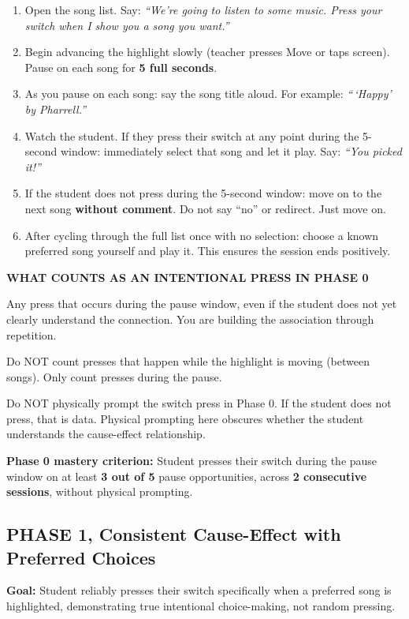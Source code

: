 \documentclass[justified,openright]{tufte-book}
\begin{document}
\begin{enumerate}
\item
  Open the song list. Say: \emph{``We're going to listen to some music.
  Press your switch when I show you a song you want.''}
\item
  Begin advancing the highlight slowly (teacher presses Move or taps
  screen). Pause on each song for \textbf{5 full seconds}.
\item
  As you pause on each song: say the song title aloud. For example:
  \emph{``\,`Happy' by Pharrell.''}
\item
  Watch the student. If they press their switch at any point during the
  5-second window: immediately select that song and let it play. Say:
  \emph{``You picked it!''}
\item
  If the student does not press during the 5-second window: move on to
  the next song \textbf{without comment}. Do not say ``no'' or redirect.
  Just move on.
\item
  After cycling through the full list once with no selection: choose a
  known preferred song yourself and play it. This ensures the session
  ends positively.
\end{enumerate}


\textbf{WHAT COUNTS AS AN INTENTIONAL PRESS IN PHASE 0}

Any press that occurs during the pause window, even if the student
does not yet clearly understand the connection. You are building the
association through repetition.

Do NOT count presses that happen while the highlight is moving (between
songs). Only count presses during the pause.

Do NOT physically prompt the switch press in Phase 0. If the student
does not press, that is data. Physical prompting here obscures whether
the student understands the cause-effect relationship.


\textbf{Phase 0 mastery criterion:} Student presses their switch during
the pause window on at least \textbf{3 out of 5} pause opportunities,
across \textbf{2 consecutive sessions}, without physical prompting.

\subsection{PHASE 1, Consistent Cause-Effect with Preferred
Choices}\label{phase-1-consistent-cause-effect-with-preferred-choices}

\textbf{Goal:} Student reliably presses their switch specifically when a
preferred song is highlighted, demonstrating true intentional
choice-making, not random pressing.
\end{document}

